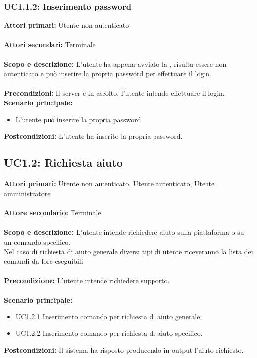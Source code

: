 \documentclass{scalatekids-article}
\begin{document}
\subsubsection{UC1.1.2: Inserimento password}

\textbf{Attori primari:} Utente non autenticato\\ \\
\textbf{Attori secondari:} Terminale\\ \\
\textbf{Scopo e descrizione:}
L'utente ha appena avviato la , risulta essere non autenticato e può inserire la propria password per effettuare il login.\\ \\
\textbf{Precondizioni:} Il server è in ascolto, l'utente intende effettuare il login.
\textbf{Scenario principale:}
\begin{itemize}
\item L'utente può inserire la propria password.
\end{itemize}
\textbf{Postcondizioni:} L'utente ha inserito la propria password.

\subsection{UC1.2: Richiesta aiuto}

\textbf{Attori primari:} Utente non autenticato, Utente autenticato, Utente amministratore\\ \\
\textbf{Attore secondario:} Terminale\\ \\
\textbf{Scopo e descrizione:} L'utente intende richiedere aiuto sulla piattaforma o su un comando specifico.\\Nel caso di richiesta di aiuto generale diversi tipi di utente riceveranno la lista dei comandi da loro eseguibili\\ \\
\textbf{Precondizione:} L'utente intende richiedere supporto.\\ \\
\textbf{Scenario principale:}
\begin{itemize}
\item UC1.2.1 Inserimento comando per richiesta di aiuto generale;
\item UC1.2.2 Inserimento comando per richiesta di aiuto specifico.
\end{itemize}
\textbf{Postcondizioni:} Il sistema ha risposto producendo in output l'aiuto richiesto.
\end{document}
